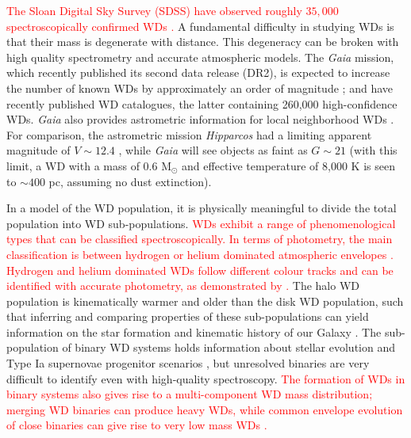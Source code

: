 \documentclass[fleqn,usenatbib]{mnras}
\newcommand{\changes}[1]{\textcolor{red}{#1}}
\begin{document}
\changes{The Sloan Digital Sky Survey (SDSS) have observed roughly $35,000$ spectroscopically confirmed WDs \citep{2013ApJS..204....5K,2015MNRAS.446.4078K,2016MNRAS.455.3413K}.} A fundamental difficulty in studying WDs is that their mass is degenerate with distance. This degeneracy can be broken with high quality spectrometry and accurate atmospheric models. The \emph{Gaia} mission, which recently published its second data release (DR2), is expected to increase the number of known WDs by approximately an order of magnitude \citep{Jordan:2006jg,2014A&A...565A..11C}; \cite{2018arXiv180702559J} and \cite{2018arXiv180703315G} have recently published WD catalogues, the latter containing 260,000 high-confidence WDs. \emph{Gaia} also provides astrometric information for local neighborhood WDs \citep{2018MNRAS.479L.113K,2018MNRAS.480.3942H}. For comparison, the astrometric mission \emph{Hipparcos} had a limiting apparent magnitude of $V \sim 12.4$ \citep{1997A&A...323L..49P}, while \emph{Gaia} will see objects as faint as $G \sim 21$ (with this limit, a WD with a mass of 0.6 M$_\odot$ and effective temperature of 8,000 K is seen to ${\sim}400$ pc, assuming no dust extinction).

In a model of the WD population, it is physically meaningful to divide the total population into WD sub-populations. \changes{WDs exhibit a range of phenomenological types that can be classified spectroscopically. In terms of photometry, the main classification is between hydrogen or helium dominated atmospheric envelopes \citep{Tremblay:2007hq,2011ApJ...737...28B,2015A&A...583A..86K}. Hydrogen and helium dominated WDs follow different colour tracks and can be identified with accurate photometry, as demonstrated by \cite{Harris:2005gd,2006AJ....131..582K,Mortlock:2008gf}.} The halo WD population is kinematically warmer and older than the disk WD population, such that inferring and comparing properties of these sub-populations can yield information on the star formation and kinematic history of our Galaxy \citep{1998ApJ...503..239I,2016MNRAS.463.2453D}. The sub-population of binary WD systems holds information about stellar evolution \citep{Postnov:2014tza} and Type Ia supernovae progenitor scenarios \citep{Livio:2018rue}, but unresolved binaries are very difficult to identify even with high-quality spectroscopy. \changes{The formation of WDs in binary systems also gives rise to a multi-component WD mass distribution; merging WD binaries can produce heavy WDs, while common envelope evolution of close binaries can give rise to very low mass WDs \citep{2013ApJS..204....5K}.}
\end{document}
